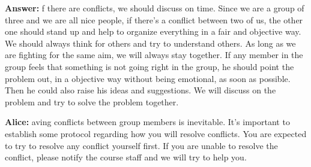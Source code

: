 \documentclass[12pt]{article}
\newenvironment{answer}[1]{
\color{blue}
	{\bf Answer:}
}{
}
\newenvironment{alice}[1]{
\color{magenta}
	{\bf Alice:}
}{
}
\begin{document}
\begin{itemize}
\begin{answer}

If there are conflicts, we should discuss on time. Since we are a group of three and we are all nice people, if there's a conflict between two of us, the other one should stand up and help to organize everything in a fair and objective way. We should always think for others and try to understand others. As long as we are fighting for the same aim, we will always stay together.
If any member in the group feels that something is not going right in the group, he should point the problem out, in a objective way without being emotional, as soon as possible. Then he could also raise his ideas and suggestions. We will discuss on the problem and try to solve the problem together.
\end{answer}

\begin{alice}

Having conflicts between group members is inevitable.  It's important to establish some protocol regarding how you will resolve conflicts.  You are expected to try to resolve any conflict yourself first.  If you are unable to resolve the conflict, please notify the course staff and we will try to help you.

\end{alice}

\end{itemize}
\end{document}
